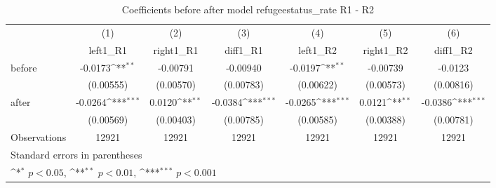 \begin{table}[!ht]\centering \footnotesize
\def\sym#1{\ifmmode^{#1}\else\(^{#1}\)\fi}
\caption{Coefficients before after model refugeestatus\_rate R1 - R2}
\begin{tabular}{l*{6}{c}}
\hline\hline
                    &\multicolumn{1}{c}{(1)}&\multicolumn{1}{c}{(2)}&\multicolumn{1}{c}{(3)}&\multicolumn{1}{c}{(4)}&\multicolumn{1}{c}{(5)}&\multicolumn{1}{c}{(6)}\\
                    &\multicolumn{1}{c}{left1\_R1}&\multicolumn{1}{c}{right1\_R1}&\multicolumn{1}{c}{diff1\_R1}&\multicolumn{1}{c}{left1\_R2}&\multicolumn{1}{c}{right1\_R2}&\multicolumn{1}{c}{diff1\_R2}\\
\hline
before              &     -0.0173\sym{**} &    -0.00791         &    -0.00940         &     -0.0197\sym{**} &    -0.00739         &     -0.0123         \\
                    &   (0.00555)         &   (0.00570)         &   (0.00783)         &   (0.00622)         &   (0.00573)         &   (0.00816)         \\
[1em]
after               &     -0.0264\sym{***}&      0.0120\sym{**} &     -0.0384\sym{***}&     -0.0265\sym{***}&      0.0121\sym{**} &     -0.0386\sym{***}\\
                    &   (0.00569)         &   (0.00403)         &   (0.00785)         &   (0.00585)         &   (0.00388)         &   (0.00781)         \\
\hline
Observations        &       12921         &       12921         &       12921         &       12921         &       12921         &       12921         \\
\hline\hline
\multicolumn{7}{l}{\footnotesize Standard errors in parentheses}\\
\multicolumn{7}{l}{\footnotesize \sym{*} \(p<0.05\), \sym{**} \(p<0.01\), \sym{***} \(p<0.001\)}\\
\end{tabular}
\end{table}
